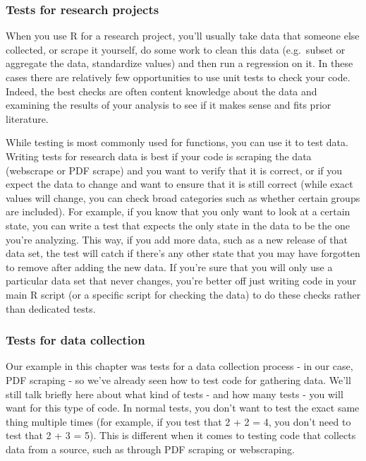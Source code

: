 \documentclass[
]{krantz}
\begin{document}
\hypertarget{tests-for-research-projects}{%
\subsubsection{Tests for research projects}\label{tests-for-research-projects}}

When you use R for a research project, you'll usually take data that someone else collected, or scrape it yourself, do some work to clean this data (e.g.~subset or aggregate the data, standardize values) and then run a regression on it. In these cases there are relatively few opportunities to use unit tests to check your code. Indeed, the best checks are often content knowledge about the data and examining the results of your analysis to see if it makes sense and fits prior literature.

While testing is most commonly used for functions, you can use it to test data. Writing tests for research data is best if your code is scraping the data (webscrape or PDF scrape) and you want to verify that it is correct, or if you expect the data to change and want to ensure that it is still correct (while exact values will change, you can check broad categories such as whether certain groups are included). For example, if you know that you only want to look at a certain state, you can write a test that expects the only state in the data to be the one you're analyzing. This way, if you add more data, such as a new release of that data set, the test will catch if there's any other state that you may have forgotten to remove after adding the new data. If you're sure that you will only use a particular data set that never changes, you're better off just writing code in your main R script (or a specific script for checking the data) to do these checks rather than dedicated tests.

\hypertarget{tests-for-data-collection}{%
\subsubsection{Tests for data collection}\label{tests-for-data-collection}}

Our example in this chapter was tests for a data collection process - in our case, PDF scraping - so we've already seen how to test code for gathering data. We'll still talk briefly here about what kind of tests - and how many tests - you will want for this type of code. In normal tests, you don't want to test the exact same thing multiple times (for example, if you test that 2 + 2 = 4, you don't need to test that 2 + 3 = 5). This is different when it comes to testing code that collects data from a source, such as through PDF scraping or webscraping.
\end{document}

